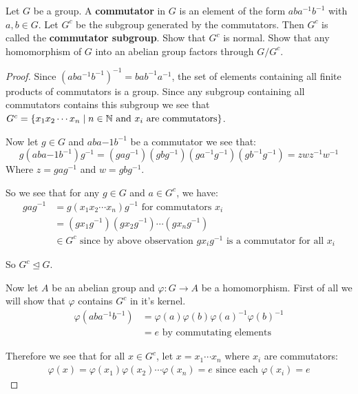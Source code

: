     \begin{exercise}
        Let $G$ be a group. A \textbf{commutator} in $G$ is an element of the form $aba^{-1}b^{-1}$ with $a,b\in G$. Let $G^c$ be the subgroup generated by the commutators. Then $G^c$ is called the \textbf{commutator subgroup}. Show that $G^c$ is normal. Show that any homomorphism of $G$ into an abelian group factors through $G/G^c$.

        \begin{proof}
            Since ${(aba^{-1}b^{-1})}^{-1} = bab^{-1}a^{-1}$, the set of elements containing all finite products of commutators is a group. Since any subgroup containing all commutators contains this subgroup we see that $G^c = \{x_1x_2\cdots x_n \mid n\in \mathbb{N} \text{ and } x_i \text{ are commutators}\}$.

            Now let $g\in G$ and $aba{-1}b^{-1}$ be a commutator we see that:\begin{equation*}
                g{(aba{-1}b^{-1})}g^{-1} = ({gag^{-1}})({gbg^{-1}})({ga^{-1}g^{-1}})({gb^{-1}g^{-1}}) = zwz^{-1}w^{-1} 
            \end{equation*}
            Where $z = gag^{-1}$ and $w = gbg^{-1}$.

            So we see that for any $g\in G$ and $a\in G^c$, we have:\begin{align*}
                gag^{-1} &= g(x_1x_2\cdots x_n)g^{-1} \text{ for commutators }x_i\\
                         &= (gx_1g^{-1})(gx_2g^{-1})\cdots (g{x_n}g^{-1})\\
                         &\in G^c \text{ since by above observation }gx_ig^{-1} \text{ is a commutator for all }x_i
            \end{align*}

            So $G^c\trianglelefteq G$.

            Now let $A$ be an abelian group and $\varphi\colon G\rightarrow A$ be a homomorphism. First of all we will show that $\varphi$ contains $G^c$ in it's kernel.\begin{align*}
                \varphi(aba^{-1}b^{-1}) &= \varphi(a)\varphi(b)\varphi(a)^{-1}\varphi(b)^{-1}\\
                                        &= e \text{ by commutating elements}
            \end{align*}

            Therefore we see that for all $x\in G^c$, let $x = x_1\cdots x_n$ where $x_i$ are commutators:\begin{align}
                \varphi(x) = \varphi(x_1)\varphi(x_2)\cdots \varphi(x_n) = e \text{ since each }\varphi(x_i) = e
            \end{align}


\end{proof}
\end{exercise}
